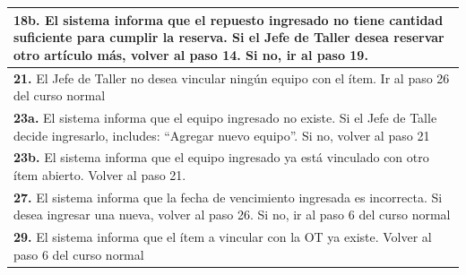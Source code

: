 \documentclass[12pt]{extarticle}
\begin{document}
\begin{spacing}{1.2}
\begin{longtable}{ |p{8cm}|p{8cm}| }
        \hline
        \multicolumn{2}{|p{16cm}|}{\textbf{18b. }El sistema informa que el repuesto ingresado no tiene cantidad suficiente para cumplir la reserva. Si el Jefe de Taller desea reservar otro artículo más, volver al paso 14. Si no, ir al paso 19.}\\
        \hline
        \multicolumn{2}{|p{16cm}|}{\textbf{21. }El Jefe de Taller no desea vincular ningún equipo con el ítem. Ir al paso 26 del curso normal}\\
        \hline
        \multicolumn{2}{|p{16cm}|}{\textbf{23a. }El sistema informa que el equipo ingresado no existe. Si el Jefe de Talle decide ingresarlo, includes: ``Agregar nuevo equipo''. Si no, volver al paso 21}\\
        \hline
        \multicolumn{2}{|p{16cm}|}{\textbf{23b. }El sistema informa que el equipo ingresado ya está vinculado con otro ítem abierto. Volver al paso 21.}\\
        \hline
        \multicolumn{2}{|p{16cm}|}{\textbf{27. }El sistema informa que la fecha de vencimiento ingresada es incorrecta. Si desea ingresar una nueva, volver al paso 26. Si no, ir al paso 6 del curso normal}\\
        \hline  
        \multicolumn{2}{|p{16cm}|}{\textbf{29. }El sistema informa que el ítem a vincular con la OT ya existe. Volver al paso 6 del curso normal}\\
        \hline  
    \end{longtable}

    \setcounter{step}{0}


\end{spacing}
\end{document}
